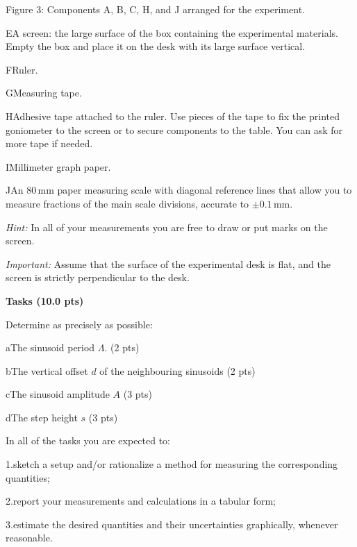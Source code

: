 Figure 3: Components A, B, C, H, and J arranged for the experiment.

E\quad A screen: the large surface of the box containing the experimental
materials. Empty the box and place it on the desk with its large surface
vertical.

F\quad Ruler.

G\quad Measuring tape.

H\quad Adhesive tape attached to the ruler. Use pieces of the tape to fix the
printed goniometer to the screen or to secure components to the table. You can
ask for more tape if needed.

I\quad Millimeter graph paper.

J\quad An $80\,\mathrm{mm}$ paper measuring scale with diagonal reference lines
that allow you to measure fractions of the main scale divisions, accurate to
$\pm 0.1\,\mathrm{mm}$.

\textit{Hint:} In all of your measurements you are free to draw or put marks on
the screen.

\textit{Important:} Assume that the surface of the experimental desk is flat,
and the screen is strictly perpendicular to the desk.

\textbf{Tasks (10.0 pts)}

Determine as precisely as possible:

a\quad The sinusoid period $\Lambda$. (2 pts)

b\quad The vertical offset $d$ of the neighbouring sinusoids (2 pts)

c\quad The sinusoid amplitude $A$ (3 pts)

d\quad The step height $s$ (3 pts)

In all of the tasks you are expected to:

1.\quad sketch a setup and/or rationalize a method for measuring the
corresponding quantities;

2.\quad report your measurements and calculations in a tabular form;

3.\quad estimate the desired quantities and their uncertainties graphically,
whenever reasonable.
